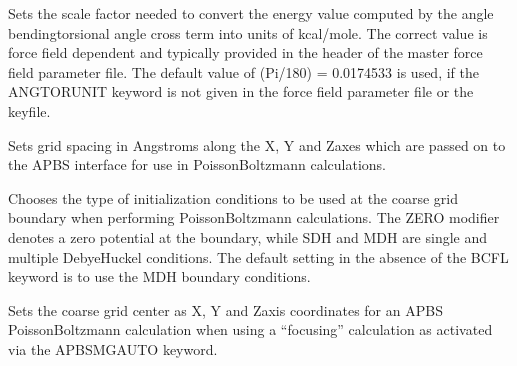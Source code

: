 \documentclass[letterpaper,11pt,english]{sphinxmanual}
\begin{document}
\ignorespaces {}\label{\detokenize{text/keywords:key-angtorunit}}\begin{description}
\sphinxAtStartPar
Sets the scale factor needed to convert the energy value computed by the angle bending\sphinxhyphen{}torsional angle cross term into units of kcal/mole. The correct value is force field dependent and typically provided in the header of the master force field parameter file. The default value of (Pi/180) = 0.0174533 is used, if the ANGTORUNIT keyword is not given in the force field parameter file or the keyfile.

\end{description}

\ignorespaces {}\label{\detokenize{text/keywords:key-apbs-agrid}}\begin{description}
\sphinxAtStartPar
Sets grid spacing in Angstroms along the X\sphinxhyphen{}, Y\sphinxhyphen{} and Z\sphinxhyphen{}axes which are passed on to the APBS interface for use in Poisson\sphinxhyphen{}Boltzmann calculations.

\end{description}

\ignorespaces {}\label{\detokenize{text/keywords:key-apbs-bcfl}}\begin{description}
\sphinxAtStartPar
Chooses the type of initialization conditions to be used at the coarse grid boundary when performing Poisson\sphinxhyphen{}Boltzmann calculations. The ZERO modifier denotes a zero potential at the boundary, while SDH and MDH are single and multiple Debye\sphinxhyphen{}Huckel conditions. The default setting in the absence of the BCFL keyword is to use the MDH boundary conditions.

\end{description}

\ignorespaces {}\label{\detokenize{text/keywords:key-apbs-cgcent}}\begin{description}
\sphinxAtStartPar
Sets the coarse grid center as X\sphinxhyphen{}, Y\sphinxhyphen{} and Z\sphinxhyphen{}axis coordinates for an APBS Poisson\sphinxhyphen{}Boltzmann calculation when using a “focusing” calculation as activated via the APBS\sphinxhyphen{}MG\sphinxhyphen{}AUTO keyword.

\end{description}
\end{document}
